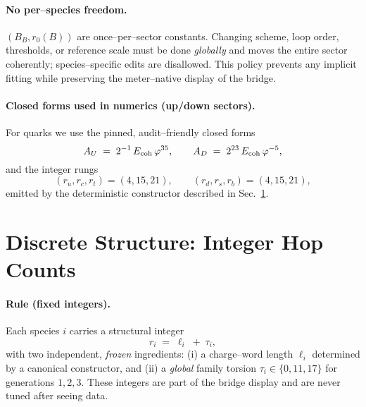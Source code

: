 \documentclass[epjc3]{svjour3}
\begin{document}
\paragraph{No per–species freedom.}
$(B_B,r_0(B))$ are once–per–sector constants. Changing scheme, loop order, thresholds, or reference scale must be done \emph{globally} and moves the entire sector coherently; species–specific edits are disallowed. This policy prevents any implicit fitting while preserving the meter–native display of the bridge.

\paragraph{Closed forms used in numerics (up/down sectors).}
For quarks we use the pinned, audit–friendly closed forms
\[
 A_U \;=\; 2^{-1}\,E_{\rm coh}\,\varphi^{35},\qquad
 A_D \;=\; 2^{23}\,E_{\rm coh}\,\varphi^{-5},
\]
and the integer rungs
\[
 (r_u,r_c,r_t)=(4,15,21),\qquad (r_d,r_s,r_b)=(4,15,21),
\]
emitted by the deterministic constructor described in Sec.~\ref{sec:discrete-structure}.

\section{Discrete Structure: Integer Hop Counts}\label{sec:discrete-structure}

\paragraph{Rule (fixed integers).}
Each species $i$ carries a structural integer
\[
r_i \;=\; \ell_i \;+\; \tau_i,
\]
with two independent, \emph{frozen} ingredients:
(i) a charge–word length $\ell_i$ determined by a canonical constructor, and
(ii) a \emph{global} family torsion $\tau_i\in\{0,11,17\}$ for generations $1,2,3$.
These integers are part of the bridge display and are never tuned after seeing data.
\end{document}
